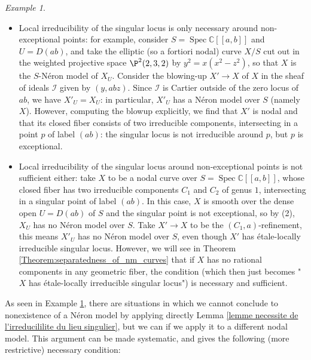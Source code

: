 \documentclass[a4paper,12pt]{amsart} %
\numberwithin{equation}{subsection}
\newcommand{\Spec}{\operatorname{Spec}}
\theoremstyle{definition}
\theoremstyle{plain}%
\theoremstyle{remark}
\newtheorem{example}[definition]{Example}
\begin{document}
\begin{example}\label{example purity only after blowup}
	\begin{itemize}
		\item Local irreducibility of the singular locus is only necessary around non-exceptional points: for example, consider $S=\Spec \mathbb{C}[[a,b]]$ and $U=D(ab)$, and take the elliptic (so a fortiori nodal) curve $X/S$ cut out in the weighted projective space $\P^2(2,3,2)$ by $y^2=x(x^2-z^2)$, so that $X$ is the $S$-N\'eron model of $X_U$. Consider the blowing-up $X'\to X$ of $X$ in the sheaf of ideals $\mathcal{I}$ given by $(y,abz)$. Since $\mathcal{I}$ is Cartier outside of the zero locus of $ab$, we have $X'_U=X_U$: in particular, $X'_U$ has a N\'eron model over $S$ (namely $X$). However, computing the blowup explicitly, we find that $X'$ is nodal and that its closed fiber consists of two irreducible components, intersecting in a point $p$ of label $(ab)$: the singular locus is not irreducible around $p$, but $p$ is exceptional.
		\item Local irreducibility of the singular locus around non-exceptional points is not sufficient either: take $X$ to be a nodal curve over $S=\Spec\mathbb{C}[[a,b]]$, whose closed fiber has two irreducible components $C_1$ and $C_2$ of genus $1$, intersecting in a singular point of label $(ab)$. In this case, $X$ is smooth over the dense open $U=D(ab)$ of $S$ and the singular point is not exceptional, so by (2), $X_U$ has no N\'eron model over $S$. Take $X'\to X$ to be the $(C_1,a)$-refinement, this means $X'_U$ has no N\'eron model over $S$, even though $X'$ has \'etale-locally irreducible singular locus. However, we will see in Theorem \ref{Theorem:separatedness_of_nm_curves} that if $X$ has no rational components in any geometric fiber, the condition (which then just becomes "$X$ has \'etale-locally irreducible singular locus") is necessary and sufficient.
	\end{itemize}
\end{example}

As seen in Example \ref{example purity only after blowup}, there are situations in which we cannot conclude to nonexistence of a N\'eron model by applying directly Lemma \ref{lemme necessite de l'irreducililite du lieu singulier}, but we can if we apply it to a different nodal model. This argument can be made systematic, and gives the following (more restrictive) necessary condition:
\end{document}

